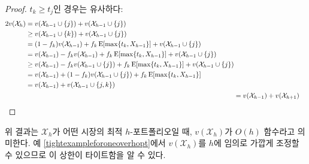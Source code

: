 \documentclass[11pt]{article} %
\newif\ifen
\theoremstyle{definition}
\newtheorem{example}{Example}
\theoremstyle{definition}
\newtheorem{example}{예}
\begin{document}
\begin{proof}
\ifen If $t_k \geq t_j$, then the steps are analogous:
\else  $t_k \geq t_j$인 경우는 유사하다:\fi
\begin{align}
\begin{split}
2 v(\mathcal{X}_h) &= v(\mathcal{X}_{h-1} \cup\{j\}) + v(\mathcal{X}_{h-1} \cup\{j\}) \\
&\geq v(\mathcal{X}_{h-1} \cup\{k\}) + v(\mathcal{X}_{h-1} \cup\{j\}) \\
&= (1 - f_k) v(\mathcal{X}_{h-1}) + f_k \operatorname{E}[\max\{t_k, X_{h-1}\}] +  v(\mathcal{X}_{h-1} \cup\{j\})  \\
&= v(\mathcal{X}_{h-1}) - f_k  v(\mathcal{X}_{h-1}) + f_k \operatorname{E}[\max\{t_k, X_{h-1}\}] +  v(\mathcal{X}_{h-1} \cup\{j\})  \\
&\geq v(\mathcal{X}_{h-1}) - f_k  v(\mathcal{X}_{h-1}\cup\{j\}) + f_k \operatorname{E}[\max\{t_k, X_{h-1}\}] +  v(\mathcal{X}_{h-1} \cup\{j\})  \\
&= v(\mathcal{X}_{h-1}) + (1 - f_k) v(\mathcal{X}_{h-1}\cup\{j\}) + f_k \operatorname{E}[\max\{t_k, X_{h-1}\}]  \\
&= v(\mathcal{X}_{h-1}) + v(\mathcal{X}_{h-1} \cup\{j, k\})
\end{split}\\
&= v(\mathcal{X}_{h-1})  + v(\mathcal{X}_{h+1}) \qedhere
\end{align}
\end{proof}
\ifen
\noindent It follows that when $\mathcal{X}_h$ is the optimal $h$-portfolio for a given market, $v(\mathcal{X}_h)$ is $O(h)$. Example \ref{tightexampleforoneoverhopt}, in which $v(\mathcal{X}_h)$ can be made arbitrarily close to $h$, establishes the tightness of this bound.
\else
\noindent 위 결과는 $\mathcal{X}_h$가 어떤 시장의 최적 $h$-포트폴리오일 때, $v(\mathcal{X}_h)$가 $O(h)$ 함수라고 의미한다. 예 \ref{tightexampleforoneoverhopt}에서 $v(\mathcal{X}_h)$를 $h$에 임의로 가깝게 조정할 수 있으므로 이 상한이 타이트함을 알 수 있다.
\fi

\end{document}
